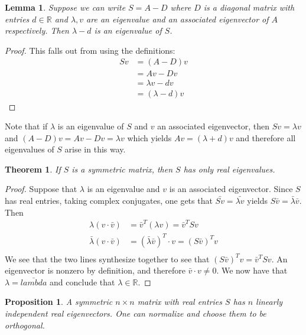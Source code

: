 \documentclass[10pt, letterpaper]{article}
\newcommand{\field}[1]{\mathbb{#1}}
\newtheorem{thm}{Theorem}
\newtheorem{lemma}{Lemma}
\newtheorem{prop}{Proposition}
\theoremstyle{remark}
\theoremstyle{definition}
\begin{document}
    \begin{lemma}
        Suppose we can write $S=A-D$ where $D$ is a diagonal matrix with entries $d \in \field{R}$ and $\lambda, v$ are
        an eigenvalue and an associated eigenvector of $A$ respectively. Then $\lambda - d$ is an eigenvalue of $S$.
    \end{lemma}

    \begin{proof}
        This falls out from using the definitions:
        \begin{align*}
            Sv &= (A-D)v \\
               &= Av - Dv \\
               &= \lambda v - dv \\
               &= (\lambda - d) v
        \end{align*}
    \end{proof}

    Note that if $\lambda$ is an eigenvalue of $S$ and $v$ an associated eigenvector, then $Sv = \lambda v$ and
    $(A-D)v = Av - Dv = \lambda v$ which yields $Av = (\lambda + d)v$ and therefore all eigenvalues of $S$ arise in this
    way.

    \begin{thm}
        If $S$ is a symmetric matrix, then $S$ has only real eigenvalues.
    \end{thm}

    \begin{proof}
        Suppose that $\lambda$ is an eigenvalue and $v$ is an associated eigenvector. Since $S$ has real entries, taking
        complex conjugates, one gets that $\bar{Sv} = \bar{\lambda v}$ yields $S \bar{v} = \bar{\lambda}\bar{v}$. Then
        \begin{align*}
            \lambda (v \cdot \bar{v}) & = \bar{v}^T (\lambda v) = \bar{v}^T Sv \\
            \bar{\lambda} (v \cdot \bar{v}) &= (\bar{\lambda}\bar{v})^T \cdot v = (S \bar{v})^T v \\
        \end{align*}
        We see that the two lines synthesize together to see that $(S\bar{v})^T v = \bar{v}^T Sv$. An eigenvector is nonzero
        by definition, and therefore $\bar{v} \cdot v \neq 0$. We now have that $\lambda = \bar{lambda}$ and conclude that
        $\lambda \in \field{R}$.
    \end{proof}

    \begin{prop}
        A symmetric $n \times n$ matrix with real entries $S$ has $n$ linearly independent real eigenvectors. One can normalize
        and choose them to be orthogonal.
    \end{prop}
\end{document}
